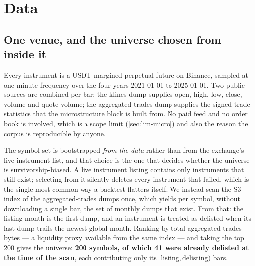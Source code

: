 %
\section{Data}
\label{sec:data}

\subsection{One venue, and the universe chosen from inside it}
\label{sec:data-universe}

Every instrument is a USDT-margined perpetual future on Binance, sampled at one-minute frequency
over the four years \mbox{2021-01-01} to \mbox{2025-01-01}. Two public sources are combined per
bar: the klines dump supplies open, high, low, close, volume and quote volume; the aggregated-trades
dump supplies the signed trade statistics that the microstructure block is built from. No paid feed
and no order book is involved, which is a scope limit (\cref{sec:lim-micro}) and also the reason
the corpus is reproducible by anyone.

The symbol set is bootstrapped \emph{from the data} rather than from the exchange's live instrument
list, and that choice is the one that decides whether the universe is survivorship-biased. A live
instrument listing contains only instruments that still exist; selecting from it silently deletes
every instrument that failed, which is the single most common way a backtest flatters itself. We
instead scan the S3 index of the aggregated-trades dumps once, which yields per symbol, without
downloading a single bar, the set of monthly dumps that exist. From that: the listing month is the
first dump, and an instrument is treated as delisted when its last dump trails the newest global
month. Ranking by total aggregated-trades bytes --- a liquidity proxy available from the same
index --- and taking the top 200 gives the universe: \textbf{200 symbols, of which 41 were already
delisted at the time of the scan}, each contributing only its $[\text{listing}, \text{delisting})$
bars.

